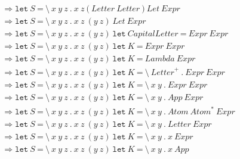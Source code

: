 \documentclass[a4paper,12pt]{article}
\begin{document}
\[\begin{aligned}
&\Longrightarrow \texttt{let}\ S\ \texttt{=}\ \texttt{\textbackslash}\ x\ y\ z\ \texttt{.}\ x\ z\ \texttt{(}\ \textit{Letter}\ \textit{Letter}\ \texttt{)}\ \textit{Let}\ \textit{Expr}\\
&\Longrightarrow \texttt{let}\ S\ \texttt{=}\ \texttt{\textbackslash}\ x\ y\ z\ \texttt{.}\ x\ z\ (y\ z)\ \textit{Let}\ \textit{Expr}\\
&\Longrightarrow \texttt{let}\ S\ \texttt{=}\ \texttt{\textbackslash}\ x\ y\ z\ \texttt{.}\ x\ z\ (y\ z)\ \texttt{let}\ \textit{CapitalLetter}\ \texttt{=}\ \textit{Expr}\ \textit{Expr}\\
&\Longrightarrow \texttt{let}\ S\ \texttt{=}\ \texttt{\textbackslash}\ x\ y\ z\ \texttt{.}\ x\ z\ (y\ z)\ \texttt{let}\ K\ \texttt{=}\ \textit{Expr}\ \textit{Expr}\\
&\Longrightarrow \texttt{let}\ S\ \texttt{=}\ \texttt{\textbackslash}\ x\ y\ z\ \texttt{.}\ x\ z\ (y\ z)\ \texttt{let}\ K\ \texttt{=}\ \textit{Lambda}\ \textit{Expr}\\
&\Longrightarrow \texttt{let}\ S\ \texttt{=}\ \texttt{\textbackslash}\ x\ y\ z\ \texttt{.}\ x\ z\ (y\ z)\ \texttt{let}\ K\ \texttt{=}\ \texttt{\textbackslash}\ \textit{Letter}^{+}\ \texttt{.}\ \textit{Expr}\ \textit{Expr}\\
&\Longrightarrow \texttt{let}\ S\ \texttt{=}\ \texttt{\textbackslash}\ x\ y\ z\ \texttt{.}\ x\ z\ (y\ z)\ \texttt{let}\ K\ \texttt{=}\ \texttt{\textbackslash}\ x\ y\ \texttt{.}\ \textit{Expr}\ \textit{Expr}\\
&\Longrightarrow \texttt{let}\ S\ \texttt{=}\ \texttt{\textbackslash}\ x\ y\ z\ \texttt{.}\ x\ z\ (y\ z)\ \texttt{let}\ K\ \texttt{=}\ \texttt{\textbackslash}\ x\ y\ \texttt{.}\ \textit{App}\ \textit{Expr}\\
&\Longrightarrow \texttt{let}\ S\ \texttt{=}\ \texttt{\textbackslash}\ x\ y\ z\ \texttt{.}\ x\ z\ (y\ z)\ \texttt{let}\ K\ \texttt{=}\ \texttt{\textbackslash}\ x\ y\ \texttt{.}\ \textit{Atom}\ \textit{Atom}^{*}\ \textit{Expr}\\
&\Longrightarrow \texttt{let}\ S\ \texttt{=}\ \texttt{\textbackslash}\ x\ y\ z\ \texttt{.}\ x\ z\ (y\ z)\ \texttt{let}\ K\ \texttt{=}\ \texttt{\textbackslash}\ x\ y\ \texttt{.}\ \textit{Letter}\ \textit{Expr}\\
&\Longrightarrow \texttt{let}\ S\ \texttt{=}\ \texttt{\textbackslash}\ x\ y\ z\ \texttt{.}\ x\ z\ (y\ z)\ \texttt{let}\ K\ \texttt{=}\ \texttt{\textbackslash}\ x\ y\ \texttt{.}\ x\ \textit{Expr}\\
&\Longrightarrow \texttt{let}\ S\ \texttt{=}\ \texttt{\textbackslash}\ x\ y\ z\ \texttt{.}\ x\ z\ (y\ z)\ \texttt{let}\ K\ \texttt{=}\ \texttt{\textbackslash}\ x\ y\ \texttt{.}\ x\ \textit{App}\\

\end{aligned}\]
\end{document}
